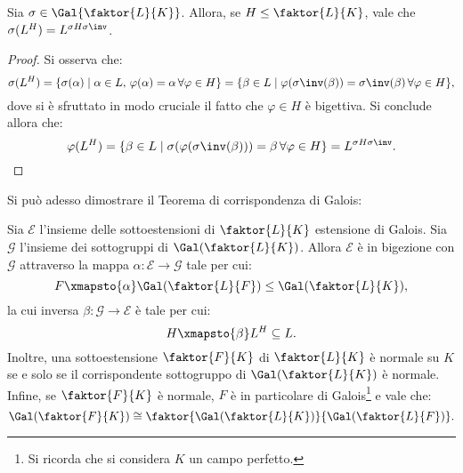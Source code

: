 \documentclass[12pt]{scrartcl}
\begin{document}
	\begin{proposition}
		Sia $\sigma \in \Gal{\faktor{L}{K}}$. Allora,
		se $H \leq \faktor{L}{K}$, vale che
		$\sigma(L^H) = L^{\sigma H \sigma\inv}$.
	\end{proposition}

	\begin{proof}
		Si osserva che:
		\[ \sigma(L^H) = \{ \sigma(\alpha) \mid \alpha \in L, \, \varphi(\alpha) = \alpha \, \forall \varphi \in H \} = \{ \beta \in L \mid \varphi(\sigma\inv(\beta)) = \sigma\inv(\beta) \, \forall \varphi \in H \}, \]
		dove si è sfruttato in modo cruciale il fatto che $\varphi \in H$ è bigettiva. Si
		conclude allora che:
		\[ \varphi(L^H) = \{ \beta \in L \mid \sigma(\varphi(\sigma\inv(\beta))) = \beta \, \forall \varphi \in H \} = L^{\sigma H \sigma\inv}. \]
	\end{proof}

	Si può adesso dimostrare il Teorema di corrispondenza di
	Galois:
	
	\begin{theorem}
		Sia $\mathcal{E}$ l'insieme delle sottoestensioni
		di $\faktor{L}{K}$ estensione di Galois. Sia
		$\mathcal{G}$ l'insieme dei sottogruppi di
		$\Gal(\faktor{L}{K})$. Allora $\mathcal{E}$ è
		in bigezione con $\mathcal{G}$ attraverso
		la mappa $\alpha : \mathcal{E} \to \mathcal{G}$
		tale per cui:
		\[ F \xmapsto{\alpha} \Gal(\faktor{L}{F}) \leq
			\Gal(\faktor{L}{K}), \]
		la cui inversa $\beta : \mathcal{G} \to \mathcal{E}$
		è tale per cui:
		\[ H \xmapsto{\beta} L^H \subseteq L. \]
		Inoltre, una sottoestensione $\faktor{F}{K}$ di
		$\faktor{L}{K}$ è normale su $K$ se e solo se
		il corrispondente sottogruppo di $\Gal(\faktor{L}{K})$
		è normale. Infine, se $\faktor{F}{K}$ è normale,
		$F$ è in particolare di Galois\footnote{
			Si ricorda che si considera $K$ un campo perfetto.
		} e vale che:
		\[ \Gal(\faktor{F}{K}) \cong \faktor{\Gal(\faktor{L}{K})}{\Gal(\faktor{L}{F})}. \]
	\end{theorem}
\end{document}
